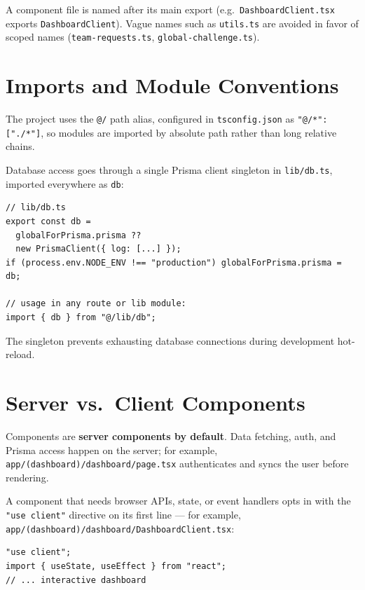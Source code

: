 \documentclass[11pt]{article}
\begin{document}
A component file is named after its main export (e.g.\
\texttt{DashboardClient.tsx} exports \texttt{DashboardClient}). Vague names
such as \texttt{utils.ts} are avoided in favor of scoped names
(\texttt{team-requests.ts}, \texttt{global-challenge.ts}).

\section{Imports and Module Conventions}

The project uses the \texttt{@/} path alias, configured in
\texttt{tsconfig.json} as \texttt{"@/*": ["./*"]}, so modules are imported by
absolute path rather than long relative chains.

Database access goes through a single Prisma client singleton in
\texttt{lib/db.ts}, imported everywhere as \texttt{db}:

\begin{verbatim}
// lib/db.ts
export const db =
  globalForPrisma.prisma ??
  new PrismaClient({ log: [...] });
if (process.env.NODE_ENV !== "production") globalForPrisma.prisma = db;

// usage in any route or lib module:
import { db } from "@/lib/db";
\end{verbatim}

The singleton prevents exhausting database connections during development
hot-reload.

\section{Server vs.\ Client Components}

Components are \textbf{server components by default}. Data fetching, auth, and
Prisma access happen on the server; for example,
\texttt{app/(dashboard)/dashboard/page.tsx} authenticates and syncs the user
before rendering.

A component that needs browser APIs, state, or event handlers opts in with the
\texttt{"use client"} directive on its first line --- for example,
\texttt{app/(dashboard)/dashboard/DashboardClient.tsx}:

\begin{verbatim}
"use client";
import { useState, useEffect } from "react";
// ... interactive dashboard
\end{verbatim}
\end{document}
